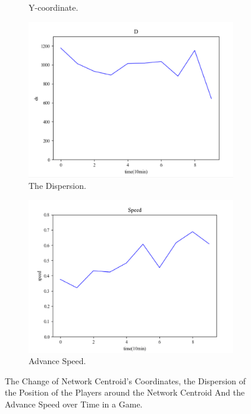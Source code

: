 \documentclass{mcmthesis}
\begin{document}
\begin{figure}[h]
\begin{subfigure}[b]{0.24\textwidth}
			\caption{Y-coordinate.}
			\label{fig:y1}
		\end{subfigure}
		\begin{subfigure}[b]{0.24\textwidth}
			\includegraphics[width=\textwidth]{figures/d1.png}
			\caption{The Dispersion.}
			\label{fig:d1}
		\end{subfigure}
		\begin{subfigure}[b]{0.24\textwidth}
			\includegraphics[width=\textwidth]{figures/s1.png}
			\caption{Advance Speed.}
			\label{fig:s1}
		\end{subfigure}
		\caption{The Change of Network Centroid's Coordinates, the Dispersion of the Position of the Players around the Network Centroid And the Advance Speed over Time in a Game.}\label{fig:game}
	\end{figure}
\end{document}
